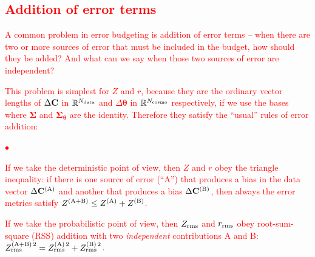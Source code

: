 \documentclass[usenatbib]{mnras}
\newcommand{\changetext}[1]{\textcolor{red}{#1}}
\begin{document}
\subsection{\changetext{Addition of error terms}}
\label{ss:addition-error}

\changetext{A common problem in error budgeting is addition of error terms -- when there are two or more sources of error that must be included in the budget, how should they be added? And what can we say when those two sources of error are independent?}

\changetext{This problem is simplest for $Z$ and $r$, because they are the ordinary vector lengths of $\Delta{\bf C}$ in ${\mathbb R}^{N_{\rm data}}$ and $\Delta{\boldsymbol\theta}$ in ${\mathbb R}^{N_{\rm cosmo}}$ respectively, if we use the bases where ${\boldsymbol\Sigma}$ and ${\boldsymbol\Sigma}_{\boldsymbol\theta}$ are the identity. Therefore they satisfy the ``usual'' rules of error addition:
\begin{list}{$\bullet$}{}
\item If we take the deterministic point of view, then $Z$ and $r$ obey the triangle inequality: if there is one source of error (``A'') that produces a bias in the data vector $\Delta{\bf C}^{(\rm A)}$ and another that produces a bias $\Delta{\bf C}^{(\rm B)}$, then always the error metrics satisfy $Z^{(\rm A+B)} \le Z^{(\rm A)} + Z^{(\rm B)}$.
\item If we take the probabilistic point of view, then $Z_{\rm rms}$ and $r_{\rm rms}$ obey root-sum-square (RSS) addition with two {\em independent} contributions A and B: $Z^{(\rm A+B)\,2}_{\rm rms} = Z^{(\rm A)\,2}_{\rm rms} + Z^{(\rm B)\,2}_{\rm rms}$.
\end{list}}
\end{document}

